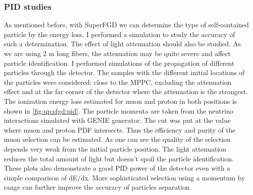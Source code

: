 \documentclass[main.tex]{subfiles}
\begin{document}
\subsubsection{PID studies}
As mentioned before, with SuperFGD we can determine the type of self-contained particle by the energy loss. I performed a simulation to study the accuracy of such a determination. The effect of light attenuation should also be studied. As we are using 2 m long fibers, the attenuation may be quite severe and affect particle identification. I performed simulations of the propagation of different particles through the detector. The samples with the different initial locations of the particles were considered: close to the MPPC, excluding the attenuation effect and at the far corner of the detector where the attenuation is the strongest. The ionization energy loss estimated for muon and proton in both positions is shown in \autoref{fig:up:sfgd:pid}. The particle momenta are taken from the neutrino interactions simulated with GENIE generator. The cut was put at the value where muon and proton PDF intersects. Thus the efficiency and purity of the muon selection can be estimated. As one can see the quality of the selection depends very weak from the initial particle position. The light attenuation reduces the total amount of light but doesn't spoil the particle identification. These plots also demonstrate a good PID power of the detector even with a simple comparison of dE/dx. More sophisticated selection using a momentum by range can further improve the accuracy of particles separation.
\end{document}
